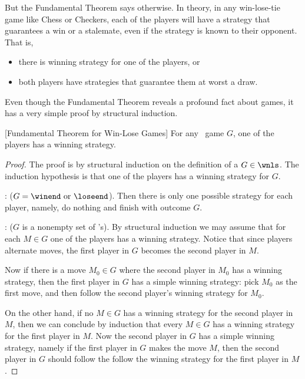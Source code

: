 \begin{definition}
But the Fundamental Theorem says otherwise.  In theory, in any
win-lose-tie game like Chess or Checkers, each of the players will
have a strategy that guarantees a win or a stalemate, even if the
strategy is known to their opponent.  That is,
\begin{itemize}
\item there is winning strategy for one of the players, or
\item both players have strategies that guarantee them at worst a draw.
\end{itemize}

Even though the Fundamental Theorem reveals a profound fact about
games, it has a very simple proof by structural induction.

\begin{theorem}\label{fundgames}[Fundamental Theorem for Win-Lose Games]
For any \wnls\ game $G$, one of the players has a winning strategy.
\end{theorem}

\begin{proof}
The proof is by structural induction on the definition of a $G \in
\wnls$.  The induction hypothesis is that one of the players has a
winning strategy for $G$.

: ($G = \winend\text{ or }\loseend$).  Then
there is only one possible strategy for each player, namely, do
nothing and finish with outcome $G$.

: ($G$ is a nonempty set of \wnls's).
By structural induction we may assume that for each $M \in G$ one of
the players has a winning strategy.  Notice that since players
alternate moves, the first player in $G$ becomes the second player in
$M$.

Now if there is a move $M_0 \in G$ where the second player in $M_0$ has a
winning strategy, then the first player in $G$ has a simple winning
strategy: pick $M_0$ as the first move, and then follow the second
player's winning strategy for $M_0$.

On the other hand, if no $M \in G$ has a winning strategy for the
second player in $M$, then we can conclude by induction that every $M
\in G$ has a winning strategy for the first player in $M$.  Now the
second player in $G$ has a simple winning strategy, namely if the first
player in $G$ makes the move $M$, then the second player in $G$ should
follow the follow the winning strategy for the first player in $M$.
\end{proof}


\end{definition}
